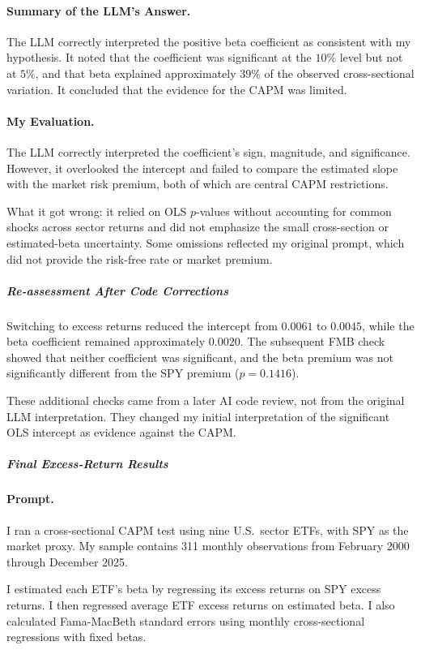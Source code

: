 \paragraph{Summary of the LLM's Answer.} The LLM correctly interpreted the
positive beta coefficient as consistent with my hypothesis. It noted that the
coefficient was significant at the $10\%$ level but not at $5\%$, and that beta
explained approximately $39\%$ of the observed cross-sectional variation. It
concluded that the evidence for the CAPM was limited.

\paragraph{My Evaluation.} The LLM correctly interpreted the coefficient's
sign, magnitude, and significance. However, it overlooked the intercept and
failed to compare the estimated slope with the market risk premium, both of
which are central CAPM restrictions.

What it got wrong: it relied on OLS $p$-values without accounting for common
shocks across sector returns and did not emphasize the small cross-section or
estimated-beta uncertainty. Some omissions reflected my original prompt, which
did not provide the risk-free rate or market premium.

\subparagraph*{Re-assessment After Code Corrections}

Switching to excess returns reduced the intercept from $0.0061$ to $0.0045$,
while the beta coefficient remained approximately $0.0020$. The subsequent FMB
check showed that neither coefficient was significant, and the beta premium was
not significantly different from the SPY premium ($p = 0.1416$).

These additional checks came from a later AI code review, not from the original
LLM interpretation. They changed my initial interpretation of the significant
OLS intercept as evidence against the CAPM.

\subparagraph*{Final Excess-Return Results}

\paragraph{Prompt.} I ran a cross-sectional CAPM test using nine U.S.\ sector
ETFs, with SPY as the market proxy. My sample contains 311 monthly observations
from February 2000 through December 2025.

I estimated each ETF's beta by regressing its excess returns on SPY excess
returns. I then regressed average ETF excess returns on estimated beta. I also
calculated Fama-MacBeth standard errors using monthly cross-sectional
regressions with fixed betas.

